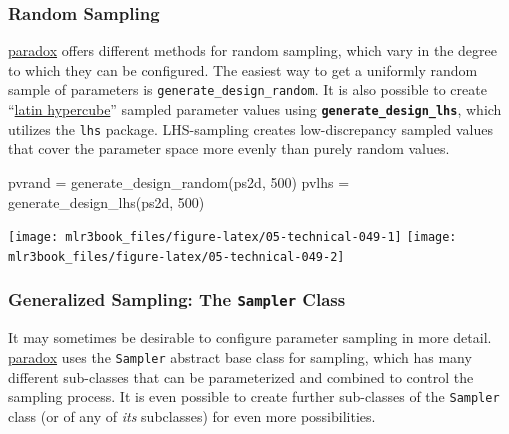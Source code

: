 \documentclass[
  11pt,
  parskip=half,
  DIV=calc,
  BCOR=10mm,
  x11names]{scrbook}
\newenvironment{Shaded}{}{}
\newcommand{\DecValTok}[1]{#1}
\newcommand{\KeywordTok}[1]{\textcolor[rgb]{0.00,0.00,1.00}{#1}}
\newcommand{\NormalTok}[1]{#1}
\newcommand{\StringTok}[1]{\textcolor[rgb]{0.00,0.50,0.50}{#1}}
\begin{document}
\hypertarget{random-sampling}{%
\subsubsection{Random Sampling}\label{random-sampling}}

\href{https://paradox.mlr-org.com}{paradox} offers different methods for random sampling, which vary in the degree to which they can be configured.
The easiest way to get a uniformly random sample of parameters is \texttt{generate\_design\_random}.
It is also possible to create ``\href{https://en.wikipedia.org/wiki/Latin_hypercube_sampling}{latin hypercube}'' sampled parameter values using \textbf{\texttt{generate\_design\_lhs}}, which utilizes the \texttt{lhs} package.
LHS-sampling creates low-discrepancy sampled values that cover the parameter space more evenly than purely random values.

\begin{Shaded}
\begin{Highlighting}[]
\NormalTok{pvrand =}\StringTok{ }\KeywordTok{generate_design_random}\NormalTok{(ps2d, }\DecValTok{500}\NormalTok{)}
\NormalTok{pvlhs =}\StringTok{ }\KeywordTok{generate_design_lhs}\NormalTok{(ps2d, }\DecValTok{500}\NormalTok{)}
\end{Highlighting}
\end{Shaded}

\begin{center}\texttt{[image: mlr3book\_files/figure-latex/05-technical-049-1]} \texttt{[image: mlr3book\_files/figure-latex/05-technical-049-2]} \end{center}

\hypertarget{generalized-sampling-the-sampler-class}{%
\subsubsection{\texorpdfstring{Generalized Sampling: The \texttt{Sampler} Class}{Generalized Sampling: The Sampler Class}}\label{generalized-sampling-the-sampler-class}}

It may sometimes be desirable to configure parameter sampling in more detail.
\href{https://paradox.mlr-org.com}{paradox} uses the \texttt{Sampler} abstract base class for sampling, which has many different sub-classes that can be parameterized and combined to control the sampling process.
It is even possible to create further sub-classes of the \texttt{Sampler} class (or of any of \emph{its} subclasses) for even more possibilities.
\end{document}
